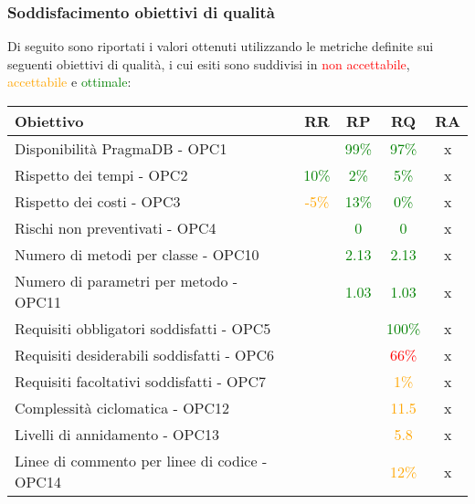 \documentclass[PdQ.tex]{subfiles}
\begin{document}
\subsubsection{Soddisfacimento obiettivi di qualità}
			Di seguito sono riportati i valori ottenuti utilizzando le metriche definite sui seguenti obiettivi di qualità, i cui esiti sono suddivisi in \textcolor{red}{non accettabile}, \textcolor{orange}{accettabile} e \textcolor{green}{ottimale}:
			\begin{table}[h]
				\centering
				\begin{tabular}{l c c c c}
					\hline
					\rule[-0.3cm]{0cm}{0.8cm}
					\textbf{Obiettivo} & \textbf{RR} & \textbf{RP} & \textbf{RQ} & \textbf{RA}\\
					\hline
					\rule[0cm]{0cm}{0.4cm}
					Disponibilità PragmaDB - OPC1 & & \textcolor{green}{99\%} & \textcolor{green}{97\%} & x\\
					\rule[0cm]{0cm}{0.4cm}
					Rispetto dei tempi - OPC2 & \textcolor{green}{10\%} & \textcolor{green}{2\%} & \textcolor{green}{5\%} & x \\
					\rule[0cm]{0cm}{0.4cm}
					Rispetto dei costi - OPC3 & \textcolor{orange}{-5\%} & \textcolor{green}{13\%} & \textcolor{green}{0\%} & x\\
					\rule[0cm]{0cm}{0.4cm}
					Rischi non preventivati - OPC4 & & \textcolor{green}{0} & \textcolor{green}{0} & x\\
					\rule[0cm]{0cm}{0.4cm}
					Numero di metodi per classe - OPC10 & & \textcolor{green}{2.13} & \textcolor{green}{2.13} & x \\
					\rule[0cm]{0cm}{0.4cm}
					Numero di parametri per metodo - OPC11 & & \textcolor{green}{1.03} & \textcolor{green}{1.03} & x\\
					\rule[0cm]{0cm}{0.4cm}
					Requisiti obbligatori soddisfatti - OPC5 & & & \textcolor{green}{100\%} & x \\
					\rule[0cm]{0cm}{0.4cm}
					Requisiti desiderabili soddisfatti - OPC6 & & & \textcolor{red}{66\%} & x \\
					\rule[0cm]{0cm}{0.4cm}
					Requisiti facoltativi soddisfatti - OPC7 & & & \textcolor{orange}{1\%} & x \\
					\rule[0cm]{0cm}{0.4cm}
					Complessità ciclomatica - OPC12 & & & \textcolor{orange}{11.5} & x \\
					\rule[0cm]{0cm}{0.4cm}
					Livelli di annidamento - OPC13 & & & \textcolor{orange}{5.8} & x\\
					\rule[0cm]{0cm}{0.4cm}
					Linee di commento per linee di codice - OPC14 & & & \textcolor{orange}{12\%} & x \\

\end{tabular}
\end{table}
\end{document}
